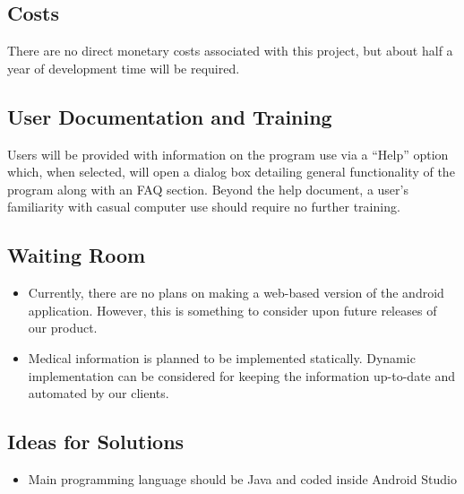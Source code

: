 \documentclass[12pt]{article}
\begin{document}
\subsection{Costs}
There are no direct monetary costs associated with this project, but about half a year of development time will be required.

\subsection{User Documentation and Training}
Users will be provided with information on the program use via a “Help” option which, when selected, will open a dialog box detailing general functionality of the program along with an FAQ section. Beyond the help document, a user’s familiarity with casual computer use should require no further training.

\subsection{Waiting Room}
\begin{itemize}
\item Currently, there are no plans on making a web-based version of the android application. However, this is something to consider upon future releases of our product.
\item Medical information is planned to be implemented statically. Dynamic implementation can be considered for keeping the information up-to-date  and automated by our clients.
\end{itemize}

\subsection{Ideas for Solutions}
\begin{itemize}
\item Main programming language should be Java and coded inside Android Studio
\end{itemize}
\end{document}

